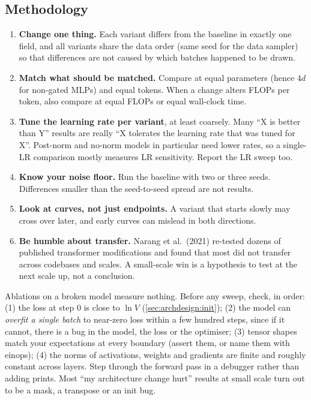\subsection{Methodology}

\begin{enumerate}
\item \textbf{Change one thing.} Each variant differs from the baseline in exactly one field, and all
  variants share the data order (same seed for the data sampler) so that differences are not caused by
  which batches happened to be drawn.
\item \textbf{Match what should be matched.} Compare at equal parameters (hence $4d$ for non-gated MLPs)
  and equal tokens. When a change alters FLOPs per token, also compare at equal FLOPs or equal
  wall-clock time.
\item \textbf{Tune the learning rate per variant}, at least coarsely. Many ``X is better than Y'' results
  are really ``X tolerates the learning rate that was tuned for X''. Post-norm and no-norm models in
  particular need lower rates, so a single-LR comparison mostly measures LR sensitivity. Report
  the LR sweep too.
\item \textbf{Know your noise floor.} Run the baseline with two or three seeds. Differences smaller than
  the seed-to-seed spread are not results.
\item \textbf{Look at curves, not just endpoints.} A variant that starts slowly may cross over later,
  and early curves can mislead in both directions.
\item \textbf{Be humble about transfer.} Narang et al.~(2021) re-tested dozens of published transformer
  modifications and found that most did not transfer across codebases and scales. A small-scale win is a
  hypothesis to test at the next scale up, not a conclusion.
\end{enumerate}

\begin{pitfall}
Ablations on a broken model measure nothing. Before any sweep, check, in order:
(1) the loss at step 0 is close to $\ln V$ (\cref{sec:archdesign:init});
(2) the model can \emph{overfit a single batch} to near-zero loss within a few hundred steps, since if it
cannot, there is a bug in the model, the loss or the optimiser;
(3) tensor shapes match your expectations at every boundary (assert them, or name them with einops);
(4) the norms of activations, weights and gradients are finite and roughly constant across layers.
Step through the forward pass in a debugger rather than adding prints. Most ``my architecture
change hurt'' results at small scale turn out to be a mask, a transpose or an init bug.
\end{pitfall}

